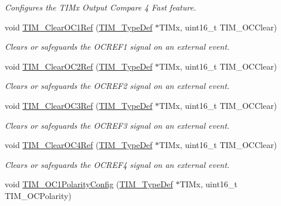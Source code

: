 \begin{DoxyCompactItemize}
\begin{DoxyCompactList}\small\item\em Configures the T\+I\+Mx Output Compare 4 Fast feature. \end{DoxyCompactList}\item 
void \mbox{\hyperlink{group___t_i_m___exported___functions_ga34e926cd8a99cfcc7480b2d6de5118b6}{T\+I\+M\+\_\+\+Clear\+O\+C1\+Ref}} (\mbox{\hyperlink{struct_t_i_m___type_def}{T\+I\+M\+\_\+\+Type\+Def}} $\ast$T\+I\+Mx, uint16\+\_\+t T\+I\+M\+\_\+\+O\+C\+Clear)
\begin{DoxyCompactList}\small\item\em Clears or safeguards the O\+C\+R\+E\+F1 signal on an external event. \end{DoxyCompactList}\item 
void \mbox{\hyperlink{group___t_i_m___exported___functions_gac474ebc815d24c8a589969e0c68b27b0}{T\+I\+M\+\_\+\+Clear\+O\+C2\+Ref}} (\mbox{\hyperlink{struct_t_i_m___type_def}{T\+I\+M\+\_\+\+Type\+Def}} $\ast$T\+I\+Mx, uint16\+\_\+t T\+I\+M\+\_\+\+O\+C\+Clear)
\begin{DoxyCompactList}\small\item\em Clears or safeguards the O\+C\+R\+E\+F2 signal on an external event. \end{DoxyCompactList}\item 
void \mbox{\hyperlink{group___t_i_m___exported___functions_ga0bd9476a14bd346c319945ec4fa2bc67}{T\+I\+M\+\_\+\+Clear\+O\+C3\+Ref}} (\mbox{\hyperlink{struct_t_i_m___type_def}{T\+I\+M\+\_\+\+Type\+Def}} $\ast$T\+I\+Mx, uint16\+\_\+t T\+I\+M\+\_\+\+O\+C\+Clear)
\begin{DoxyCompactList}\small\item\em Clears or safeguards the O\+C\+R\+E\+F3 signal on an external event. \end{DoxyCompactList}\item 
void \mbox{\hyperlink{group___t_i_m___exported___functions_gaeee5fa66b26e7c6f71850272dc3028f3}{T\+I\+M\+\_\+\+Clear\+O\+C4\+Ref}} (\mbox{\hyperlink{struct_t_i_m___type_def}{T\+I\+M\+\_\+\+Type\+Def}} $\ast$T\+I\+Mx, uint16\+\_\+t T\+I\+M\+\_\+\+O\+C\+Clear)
\begin{DoxyCompactList}\small\item\em Clears or safeguards the O\+C\+R\+E\+F4 signal on an external event. \end{DoxyCompactList}\item 
void \mbox{\hyperlink{group___t_i_m___exported___functions_ga03878f78163485c8a3508cff2111c297}{T\+I\+M\+\_\+\+O\+C1\+Polarity\+Config}} (\mbox{\hyperlink{struct_t_i_m___type_def}{T\+I\+M\+\_\+\+Type\+Def}} $\ast$T\+I\+Mx, uint16\+\_\+t T\+I\+M\+\_\+\+O\+C\+Polarity)

\end{DoxyCompactItemize}
